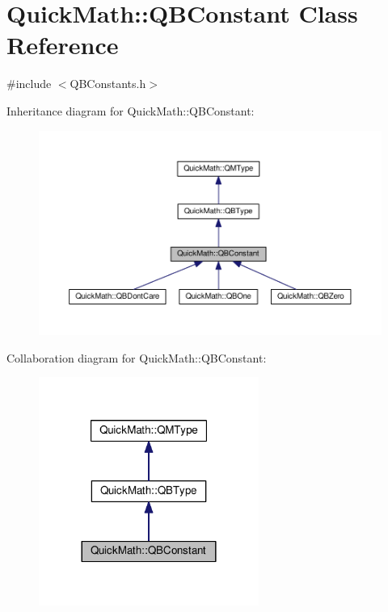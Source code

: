 \hypertarget{classQuickMath_1_1QBConstant}{}\section{Quick\+Math\+:\+:Q\+B\+Constant Class Reference}
\label{classQuickMath_1_1QBConstant}


{\ttfamily \#include $<$Q\+B\+Constants.\+h$>$}



Inheritance diagram for Quick\+Math\+:\+:Q\+B\+Constant\+:
\nopagebreak
\begin{figure}[H]
\begin{center}
\leavevmode
\includegraphics[width=350pt]{classQuickMath_1_1QBConstant__inherit__graph}
\end{center}
\end{figure}


Collaboration diagram for Quick\+Math\+:\+:Q\+B\+Constant\+:
\nopagebreak
\begin{figure}[H]
\begin{center}
\leavevmode
\includegraphics[width=204pt]{classQuickMath_1_1QBConstant__coll__graph}
\end{center}
\end{figure}

